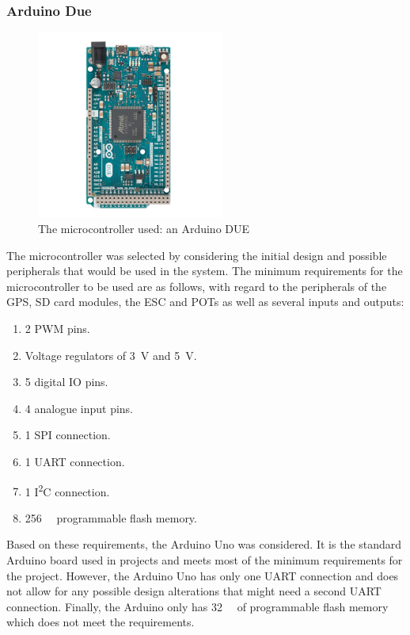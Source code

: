 		\subsubsection{Arduino Due}\par
		\begin{figure}[!ht]
			\begin{center}
				\includegraphics[width = 0.55\textwidth]{figures/DUE.jpg}
				\caption{The microcontroller used: an Arduino DUE}
				\label{fig:3:due}
			\end{center}
		\end{figure}
		The microcontroller was selected by considering the initial design and possible peripherals that would be used in the system. The minimum requirements for the microcontroller to be used are as follows, with regard to the peripherals of the GPS, SD card modules, the ESC and POTs as well as several inputs and outputs:
		\begin{enumerate}
			\item 2 PWM pins.
			\item Voltage regulators of \SI{3}{\volt} and \SI{5}{\volt}.
			\item 5 digital IO pins.
			\item 4 analogue input pins.
			\item 1 SPI connection.
			\item 1 UART connection.
			\item 1 I\textsuperscript{2}C connection.
			\item \SI{256}{\kilo\byte} programmable flash memory.		
		\end{enumerate}
		Based on these requirements, the Arduino Uno was considered. It is the standard Arduino board used in projects and meets most of the minimum requirements for the project.  However, the Arduino Uno has only one UART connection and does not allow for any possible design alterations that might need a second UART connection. Finally, the Arduino only has \SI{32}{\kilo\byte} of programmable flash memory which does not meet the requirements.\par 
